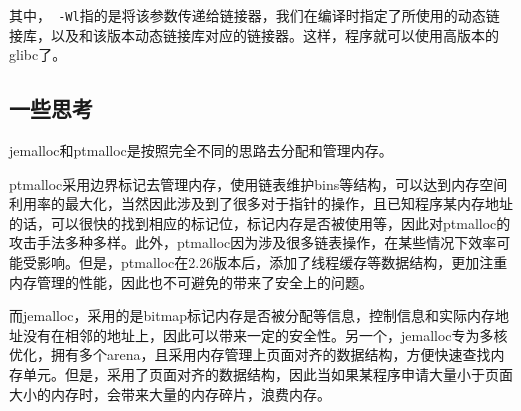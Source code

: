其中，\Verb+ -Wl+指的是将该参数传递给链接器，我们在编译时指定了所使用的动态链接库，以及和该版本动态链接库对应的链接器。这样，程序就可以使用高版本的glibc了。

\subsection{一些思考}

jemalloc和ptmalloc是按照完全不同的思路去分配和管理内存。

ptmalloc采用边界标记去管理内存，使用链表维护bins等结构，可以达到内存空间利用率的最大化，当然因此涉及到了很多对于指针的操作，且已知程序某内存地址的话，可以很快的找到相应的标记位，标记内存是否被使用等，因此对ptmalloc的攻击手法多种多样。此外，ptmalloc因为涉及很多链表操作，在某些情况下效率可能受影响。但是，ptmalloc在2.26版本后，添加了线程缓存等数据结构，更加注重内存管理的性能，因此也不可避免的带来了安全上的问题。

而jemalloc，采用的是bitmap标记内存是否被分配等信息，控制信息和实际内存地址没有在相邻的地址上，因此可以带来一定的安全性。另一个，jemalloc专为多核优化，拥有多个arena，且采用内存管理上页面对齐的数据结构，方便快速查找内存单元。但是，采用了页面对齐的数据结构，因此当如果某程序申请大量小于页面大小的内存时，会带来大量的内存碎片，浪费内存。

\newpage